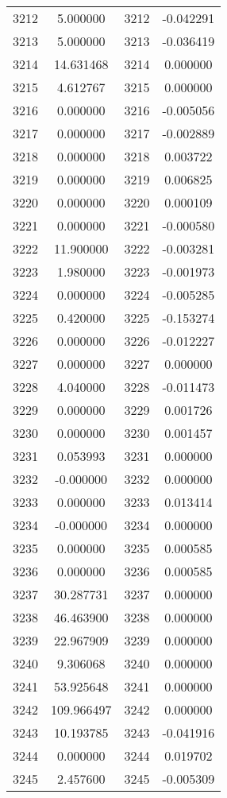 \documentclass[12pt]{article}
\begin{document}
\begin{longtable}{@{}cccc@{}}
3212 & 5.000000 & 3212 & -0.042291 \\
3213 & 5.000000 & 3213 & -0.036419 \\
3214 & 14.631468 & 3214 & 0.000000 \\
3215 & 4.612767 & 3215 & 0.000000 \\
3216 & 0.000000 & 3216 & -0.005056 \\
3217 & 0.000000 & 3217 & -0.002889 \\
3218 & 0.000000 & 3218 & 0.003722 \\
3219 & 0.000000 & 3219 & 0.006825 \\
3220 & 0.000000 & 3220 & 0.000109 \\
3221 & 0.000000 & 3221 & -0.000580 \\
3222 & 11.900000 & 3222 & -0.003281 \\
3223 & 1.980000 & 3223 & -0.001973 \\
3224 & 0.000000 & 3224 & -0.005285 \\
3225 & 0.420000 & 3225 & -0.153274 \\
3226 & 0.000000 & 3226 & -0.012227 \\
3227 & 0.000000 & 3227 & 0.000000 \\
3228 & 4.040000 & 3228 & -0.011473 \\
3229 & 0.000000 & 3229 & 0.001726 \\
3230 & 0.000000 & 3230 & 0.001457 \\
3231 & 0.053993 & 3231 & 0.000000 \\
3232 & -0.000000 & 3232 & 0.000000 \\
3233 & 0.000000 & 3233 & 0.013414 \\
3234 & -0.000000 & 3234 & 0.000000 \\
3235 & 0.000000 & 3235 & 0.000585 \\
3236 & 0.000000 & 3236 & 0.000585 \\
3237 & 30.287731 & 3237 & 0.000000 \\
3238 & 46.463900 & 3238 & 0.000000 \\
3239 & 22.967909 & 3239 & 0.000000 \\
3240 & 9.306068 & 3240 & 0.000000 \\
3241 & 53.925648 & 3241 & 0.000000 \\
3242 & 109.966497 & 3242 & 0.000000 \\
3243 & 10.193785 & 3243 & -0.041916 \\
3244 & 0.000000 & 3244 & 0.019702 \\
3245 & 2.457600 & 3245 & -0.005309 \\

\end{longtable}
\end{document}
